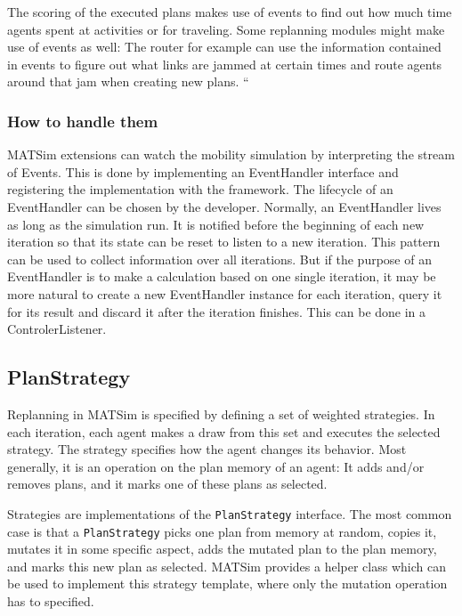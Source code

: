 The scoring of the executed plans makes use of events to find out how much time agents spent at activities or for traveling. Some replanning modules might make use of events as well: The router for example can use the information contained in events to figure out what links are jammed at certain times and route agents around that jam when creating new plans.
``

\subsubsection{How to handle them}
MATSim extensions can watch the mobility simulation by interpreting the stream of Events. This is done
by implementing an EventHandler interface and registering the implementation with the framework. The lifecycle of
an EventHandler can be chosen by the developer. Normally, an EventHandler lives as long as the simulation run.
It is notified before the beginning of each new iteration so that its state can be reset to listen to a new
iteration. This pattern can be used to collect information over all iterations. But if the purpose of
an EventHandler is to make a calculation based on one single iteration, it may be more natural
to create a new EventHandler instance for each iteration, query it for its result and discard it
after the iteration finishes. This can be done in a ControlerListener.

\subsection{PlanStrategy}

Replanning in MATSim is specified by defining a set of weighted strategies. In each
iteration, each agent makes a draw from this set and executes the selected strategy. The
strategy specifies how the agent changes its behavior. Most generally, it is an operation on the plan memory
of an agent: It adds and/or removes plans, and it marks one of these plans as selected.

Strategies are implementations of the \lstinline$PlanStrategy$ interface. 
The most common case is that a \lstinline$PlanStrategy$ picks one plan from memory
at random, copies it, mutates it in some specific aspect, adds the mutated plan to the plan memory, and
marks this new plan as selected. MATSim provides a helper class which can be used
to implement this strategy template, where only the mutation operation has to specified.


